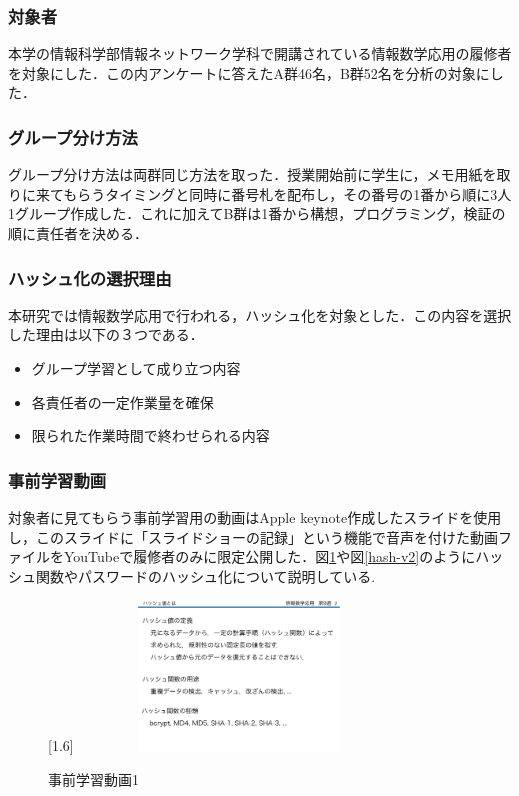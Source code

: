 \documentclass[a4j,11pt]{jsarticle}
\begin{document}
\newpage

\subsubsection{対象者}
本学の情報科学部情報ネットワーク学科で開講されている情報数学応用の履修者を対象にした．この内アンケートに答えたA群46名，B群52名を分析の対象にした．



\subsubsection{グループ分け方法}
グループ分け方法は両群同じ方法を取った．授業開始前に学生に，メモ用紙を取りに来てもらうタイミングと同時に番号札を配布し，その番号の1番から順に3人1グループ作成した．これに加えてB群は1番から構想，プログラミング，検証の順に責任者を決める．

\subsubsection{ハッシュ化の選択理由}
本研究では情報数学応用で行われる，ハッシュ化を対象とした．この内容を選択した理由は以下の３つである．

\begin{itemize}

 \item グループ学習として成り立つ内容
  \item 各責任者の一定作業量を確保
  \item 限られた作業時間で終わせられる内容
  
\end{itemize}




\newpage

\subsubsection{事前学習動画}
対象者に見てもらう事前学習用の動画はApple keynote作成したスライドを使用し，このスライドに「スライドショーの記録」という機能で音声を付けた動画ファイルをYouTubeで履修者のみに限定公開した．図\ref{hash-v1}や図\ref{hash-v2}のようにハッシュ関数やパスワードのハッシュ化について説明している.

\begin{figure}[h]
\begin{center}
\scalebox{1}[1.6]{
 \includegraphics[clip,width=85mm,height=40mm]{hashv2.pdf}
 }
\end{center}
 \caption{事前学習動画1}
 \label{hash-v1}
\end{figure}
\end{document}
